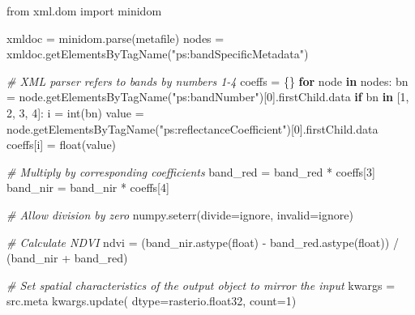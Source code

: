 \documentclass[12pt,twoside]{reedthesis}
\newenvironment{Shaded}{\begin{snugshade}}{\end{snugshade}}
\newcommand{\AttributeTok}[1]{\textcolor[rgb]{0.77,0.63,0.00}{#1}}
\newcommand{\CommentTok}[1]{\textcolor[rgb]{0.56,0.35,0.01}{\textit{#1}}}
\newcommand{\ControlFlowTok}[1]{\textcolor[rgb]{0.13,0.29,0.53}{\textbf{#1}}}
\newcommand{\DecValTok}[1]{\textcolor[rgb]{0.00,0.00,0.81}{#1}}
\newcommand{\FunctionTok}[1]{\textcolor[rgb]{0.00,0.00,0.00}{#1}}
\newcommand{\NormalTok}[1]{#1}
\newcommand{\OtherTok}[1]{\textcolor[rgb]{0.56,0.35,0.01}{#1}}
\newcommand{\SpecialCharTok}[1]{\textcolor[rgb]{0.00,0.00,0.00}{#1}}
\newcommand{\StringTok}[1]{\textcolor[rgb]{0.31,0.60,0.02}{#1}}
\begin{document}
\begin{Shaded}
\begin{Highlighting}[]
\NormalTok{    from xml.dom import minidom}

\NormalTok{    xmldoc }\OtherTok{=} \FunctionTok{minidom.parse}\NormalTok{(metafile)}
\NormalTok{    nodes }\OtherTok{=} \FunctionTok{xmldoc.getElementsByTagName}\NormalTok{(}\StringTok{"ps:bandSpecificMetadata"}\NormalTok{)}

    \CommentTok{\# XML parser refers to bands by numbers 1{-}4}
\NormalTok{    coeffs }\OtherTok{=}\NormalTok{ \{\}}
    \ControlFlowTok{for}\NormalTok{ node }\ControlFlowTok{in}\NormalTok{ nodes}\SpecialCharTok{:}
\NormalTok{        bn }\OtherTok{=} \FunctionTok{node.getElementsByTagName}\NormalTok{(}\StringTok{"ps:bandNumber"}\NormalTok{)[}\DecValTok{0}\NormalTok{].firstChild.data}
        \ControlFlowTok{if}\NormalTok{ bn }\ControlFlowTok{in}\NormalTok{ [}\StringTok{\textquotesingle{}1\textquotesingle{}}\NormalTok{, }\StringTok{\textquotesingle{}2\textquotesingle{}}\NormalTok{, }\StringTok{\textquotesingle{}3\textquotesingle{}}\NormalTok{, }\StringTok{\textquotesingle{}4\textquotesingle{}}\NormalTok{]}\SpecialCharTok{:}
\NormalTok{            i }\OtherTok{=} \FunctionTok{int}\NormalTok{(bn)}
\NormalTok{            value }\OtherTok{=} \FunctionTok{node.getElementsByTagName}\NormalTok{(}\StringTok{"ps:reflectanceCoefficient"}\NormalTok{)[}\DecValTok{0}\NormalTok{].firstChild.data}
\NormalTok{            coeffs[i] }\OtherTok{=} \FunctionTok{float}\NormalTok{(value)}

    \CommentTok{\# Multiply by corresponding coefficients}
\NormalTok{    band\_red }\OtherTok{=}\NormalTok{ band\_red }\SpecialCharTok{*}\NormalTok{ coeffs[}\DecValTok{3}\NormalTok{]}
\NormalTok{    band\_nir }\OtherTok{=}\NormalTok{ band\_nir }\SpecialCharTok{*}\NormalTok{ coeffs[}\DecValTok{4}\NormalTok{]}

    \CommentTok{\# Allow division by zero}
    \FunctionTok{numpy.seterr}\NormalTok{(}\AttributeTok{divide=}\StringTok{\textquotesingle{}ignore\textquotesingle{}}\NormalTok{, }\AttributeTok{invalid=}\StringTok{\textquotesingle{}ignore\textquotesingle{}}\NormalTok{)}

    \CommentTok{\# Calculate NDVI}
\NormalTok{    ndvi }\OtherTok{=}\NormalTok{ (}\FunctionTok{band\_nir.astype}\NormalTok{(float) }\SpecialCharTok{{-}} \FunctionTok{band\_red.astype}\NormalTok{(float)) }\SpecialCharTok{/}\NormalTok{ (band\_nir }\SpecialCharTok{+}\NormalTok{ band\_red)}

    \CommentTok{\# Set spatial characteristics of the output object to mirror the input}
\NormalTok{    kwargs }\OtherTok{=}\NormalTok{ src.meta}
    \FunctionTok{kwargs.update}\NormalTok{(}
        \AttributeTok{dtype=}\NormalTok{rasterio.float32,}
        \AttributeTok{count=}\DecValTok{1}\NormalTok{)}
    

\end{Highlighting}
\end{Shaded}
\end{document}
